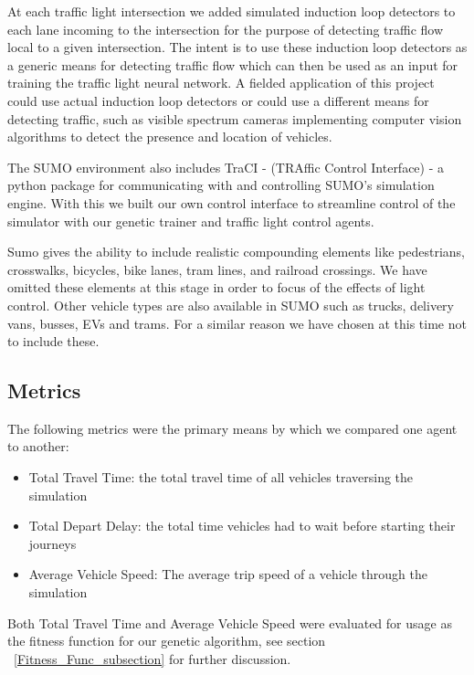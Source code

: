 \documentclass[twocolumn]{article}
\begin{document}
At each traffic light intersection we added simulated induction loop detectors to each lane incoming to the intersection for the purpose of detecting traffic flow local to a given intersection. The intent is to use these induction loop detectors as a generic means for detecting traffic flow which can then be used as an input for training the traffic light neural network. A fielded application of this project could use actual induction loop detectors or could use a different means for detecting traffic, such as visible spectrum cameras implementing computer vision algorithms to detect the presence and location of vehicles. 

The SUMO environment also includes TraCI - (TRAffic Control Interface) - a python package for communicating with and controlling SUMO's simulation engine.  With this we built our own control interface to streamline control of the simulator with our genetic trainer and traffic light control agents. 

Sumo gives the ability to include realistic compounding elements like pedestrians, crosswalks, bicycles, bike lanes, tram lines, and railroad crossings.  We have omitted these elements at this stage in order to focus of the effects of light control.  Other vehicle types are also available in SUMO such as trucks, delivery vans, busses, EVs and trams.  For a similar reason we have chosen at this time not to include these.  

\subsection{Metrics}

The following metrics were the primary means by which we compared one agent to another:

\begin{itemize}
\item Total Travel Time: the total travel time of all vehicles traversing the simulation
\item Total Depart Delay: the total time vehicles had to wait before starting their journeys
\item Average Vehicle Speed: The average trip speed of a vehicle through the simulation
\end{itemize}

Both Total Travel Time and Average Vehicle Speed were evaluated for usage as the fitness function for our genetic algorithm, see section ~\ref{Fitness_Func_subsection} for further discussion.
\end{document}
